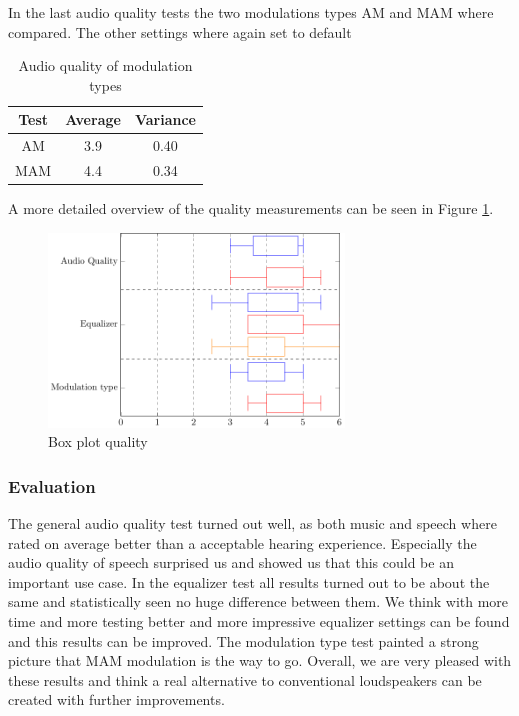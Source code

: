 \begin{enumerate}
    In the last audio quality tests the two modulations types AM and MAM where compared. The other settings where again set to default
    \begin{center}
     \begin{table}[h!]
    \centering
    \begin{tabular}{ |c|c|c|}
      \hline 
      Test & Average & Variance \\ 
      \hline
     AM & 3.9 & 0.40 \\
     \hline
     MAM & 4.4 & 0.34 \\
     \hline
    \end{tabular}
    \caption{Audio quality of modulation types}
    \label{6.1.2_tab:music_audio_quality_mod}
    \end{table}   
    \end{center}
\end{enumerate}
A more detailed overview of the quality measurements can be seen in Figure \ref{6_fig:box_plot_quality}.
\begin{figure}
    \centering
    \includegraphics[width=0.7\textwidth]{images/6_Measurements/BoxPlotQuality.pdf}
    \caption{Box plot quality}
    \label{6_fig:box_plot_quality}
\end{figure}
\subsubsection{Evaluation}
The general audio quality test turned out well, as both music and speech where rated on average better than a acceptable hearing experience. Especially the audio quality of speech surprised us and showed us that this could be an important use case. In the equalizer test all results turned out to be about the same and statistically seen no huge difference between them. We think with more time and more testing better and more impressive equalizer settings can be found and this results can be improved. The modulation type test painted a strong picture that MAM modulation is the way to go. 
Overall, we are very pleased with these results and think a real alternative to conventional loudspeakers can be created with further improvements. 
